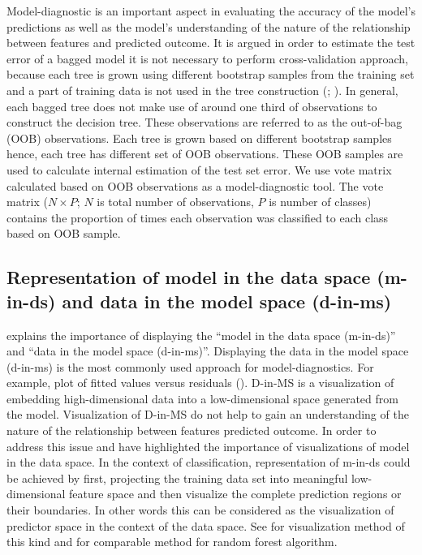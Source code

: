 \documentclass[11pt,a4paper,]{article}
\begin{document}
Model-diagnostic is an important aspect in evaluating the accuracy of
the model's predictions as well as the model's understanding of the
nature of the relationship between features and predicted outcome. It is
argued in order to estimate the test error of a bagged model it is not
necessary to perform cross-validation approach, because each tree is
grown using different bootstrap samples from the training set and a part
of training data is not used in the tree construction
(\textcite{breiman2001random}; \textcite{chen2004using}). In general,
each bagged tree does not make use of around one third of observations
to construct the decision tree. These observations are referred to as
the out-of-bag (OOB) observations. Each tree is grown based on different
bootstrap samples hence, each tree has different set of OOB
observations. These OOB samples are used to calculate internal
estimation of the test set error. We use vote matrix calculated based on
OOB observations as a model-diagnostic tool. The vote matrix
(\(N \times P\); \(N\) is total number of observations, \(P\) is number
of classes) contains the proportion of times each observation was
classified to each class based on OOB sample.

\subsection{Representation of model in the data space (m-in-ds) and data
in the model space
(d-in-ms)}\label{representation-of-model-in-the-data-space-m-in-ds-and-data-in-the-model-space-d-in-ms}

\textcite{wickham2015visualizing} explains the importance of displaying
the ``model in the data space (m-in-ds)'' and ``data in the model space
(d-in-ms)''. Displaying the data in the model space (d-in-ms) is the
most commonly used approach for model-diagnostics. For example, plot of
fitted values versus residuals (\textcite{wickham2015visualizing}).
D-in-MS is a visualization of embedding high-dimensional data into a
low-dimensional space generated from the model. Visualization of D-in-MS
do not help to gain an understanding of the nature of the relationship
between features predicted outcome. In order to address this issue
\textcite{wickham2015visualizing} and \textcite{da2017interactive} have
highlighted the importance of visualizations of model in the data space.
In the context of classification, representation of m-in-ds could be
achieved by first, projecting the training data set into meaningful
low-dimensional feature space and then visualize the complete prediction
regions or their boundaries. In other words this can be considered as
the visualization of predictor space in the context of the data space.
See \textcite{wickham2015visualizing} for visualization method of this
kind and \textcite{da2017interactive} for comparable method for random
forest algorithm.
\end{document}
